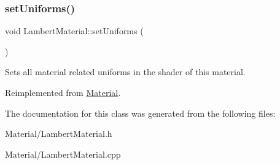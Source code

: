 \subsubsection{\texorpdfstring{setUniforms()}{setUniforms()}}
{\footnotesize\ttfamily void Lambert\+Material\+::set\+Uniforms (\begin{DoxyParamCaption}{ }\end{DoxyParamCaption})\hspace{0.3cm}{\ttfamily [virtual]}}

Sets all material related uniforms in the shader of this material. 

Reimplemented from \mbox{\hyperlink{class_material_a793da829d1f2daf3f3317d9b495f8b26}{Material}}.



The documentation for this class was generated from the following files\+:\begin{DoxyCompactItemize}
\item 
Material/Lambert\+Material.\+h\item 
Material/Lambert\+Material.\+cpp\end{DoxyCompactItemize}
